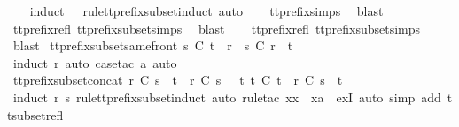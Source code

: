 %
\isadelimproof
\ \ %
\endisadelimproof
%
\isatagproof
{}\isamarkupfalse%
\ {\isacharparenleft}induct\ {\isasymrho}\ {\isasymsigma}\ rule{\isacharcolon}tt{\isacharunderscore}prefix{\isacharunderscore}subset{\isachardot}induct{\isacharcomma}\ auto{\isacharparenright}\isanewline
\ \ \isamarkupfalse%
\ tt{\isacharunderscore}prefix{\isachardot}simps{\isacharparenleft}{}{\isacharparenright}\ \isamarkupfalse%
\ blast\isanewline
\ \ \isamarkupfalse%
\ tt{\isacharunderscore}prefix{\isacharunderscore}refl\ tt{\isacharunderscore}prefix{\isacharunderscore}subset{\isachardot}simps{\isacharparenleft}{}{\isacharparenright}\ \isamarkupfalse%
\ blast\isanewline
\ \ \isamarkupfalse%
\ tt{\isacharunderscore}prefix{\isacharunderscore}refl\ tt{\isacharunderscore}prefix{\isacharunderscore}subset{\isachardot}simps{\isacharparenleft}{}{\isacharparenright}\ \isamarkupfalse%
\ blast%
\endisatagproof
{\isafoldproof}%
%
\isadelimproof
\isanewline
%
\endisadelimproof
\isanewline
{}\isamarkupfalse%
\ tt{\isacharunderscore}prefix{\isacharunderscore}subset{\isacharunderscore}same{\isacharunderscore}front{\isacharcolon}\ {\isachardoublequoteopen}s\ {\isasymlesssim}\isactrlsub C\ t\ {\isacharequal}\ {\isacharparenleft}r\ {\isacharat}\ s\ {\isasymlesssim}\isactrlsub C\ r\ {\isacharat}\ t{\isacharparenright}{\isachardoublequoteclose}\isanewline
%
\isadelimproof
\ \ %
\endisadelimproof
%
\isatagproof
{}\isamarkupfalse%
\ {\isacharparenleft}induct\ r{\isacharcomma}\ auto{\isacharcomma}\ {\isacharparenleft}case{\isacharunderscore}tac\ a{\isacharcomma}\ auto{\isacharparenright}{\isacharplus}{\isacharparenright}%
\endisatagproof
{\isafoldproof}%
%
\isadelimproof
\isanewline
%
\endisadelimproof
\isanewline
{}\isamarkupfalse%
\ tt{\isacharunderscore}prefix{\isacharunderscore}subset{\isacharunderscore}concat{\isacharcolon}\ {\isachardoublequoteopen}r\ {\isasymlesssim}\isactrlsub C\ s\ {\isacharat}\ t\ {\isasymLongrightarrow}\ r\ {\isasymlesssim}\isactrlsub C\ s\ {\isasymor}\ {\isacharparenleft}{\isasymexists}\ t{\isacharprime}{\isachardot}\ t{\isacharprime}\ {\isasymlesssim}\isactrlsub C\ t\ {\isasymand}\ r\ {\isasymsubseteq}\isactrlsub C\ s\ {\isacharat}\ t{\isacharprime}{\isacharparenright}{\isachardoublequoteclose}\isanewline
%
\isadelimproof
\ \ %
\endisadelimproof
%
\isatagproof
{}\isamarkupfalse%
\ {\isacharparenleft}induct\ r\ s\ rule{\isacharcolon}tt{\isacharunderscore}prefix{\isacharunderscore}subset{\isachardot}induct{\isacharcomma}\ auto{\isacharcomma}\ rule{\isacharunderscore}tac\ x{\isacharequal}{\isachardoublequoteopen}x\ {\isacharhash}\ xa{\isachardoublequoteclose}\ \ exI{\isacharcomma}\ auto\ simp\ add{\isacharcolon}\ tt{\isacharunderscore}subset{\isacharunderscore}refl{\isacharparenright}%
